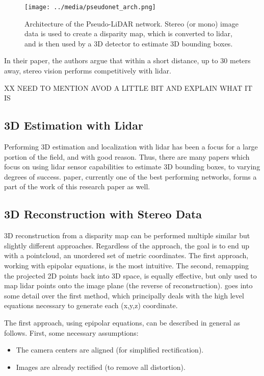 \begin{figure}[h]
    \texttt{[image: ../media/pseudonet\_arch.png]}
    \caption{Architecture of the Pseudo-LiDAR network. Stereo (or mono) image data is used to create a disparity map, which is converted to lidar, and is then used by a 3D detector to estimate 3D bounding boxes.}
    \label{pseudonet_arch} 
\end{figure}

In their paper, the authors argue that within a short distance, up to 30 meters away, stereo vision performs competitively with lidar.

XX NEED TO MENTION AVOD A LITTLE BIT AND EXPLAIN WHAT IT IS

\subsection{3D Estimation with Lidar}
Performing 3D estimation and localization with lidar has been a focus for a large portion of the field, and with good reason. Thus, there are many papers which focus on using lidar sensor capabilities to estimate 3D bounding boxes, to varying degrees of success. \cite{qi_frustum_2017} paper, currently one of the best performing networks, forms a part of the work of this research paper as well.

\subsection{3D Reconstruction with Stereo Data}
\label{sect_reconstruct}
3D reconstruction from a disparity map can be performed multiple similar but slightly different approaches. Regardless of the approach, the goal is to end up with a pointcloud, an unordered set of metric coordinates. The first approach, working with epipolar equations, is the most intuitive. The second, remapping the projected 2D points back into 3D space, is equally effective, but only used to map lidar points onto the image plane (the reverse of reconstruction). \cite{szeliski_computer_2010} goes into some detail over the first method, which principally deals with the high level equations necessary to generate each (x,y,z) coordinate.

The first approach, using epipolar equations, can be described in general as follows. First, some necessary assumptions:
\begin{itemize} \itemsep=-0.5em
    \item The camera centers are aligned (for simplified rectification).
    \item Images are already rectified (to remove all distortion).
\end{itemize}

